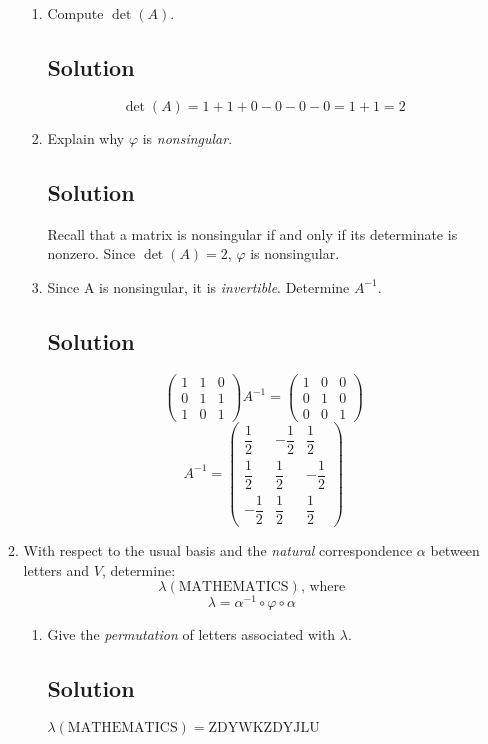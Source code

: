 \documentclass[12pt]{amsart}
\begin{document}
\begin{enumerate}
\begin{enumerate}
\begin{enumerate}
\item Compute $\det (A)$.
\subsection*{Solution}
\[ \det(A) = 1 + 1 + 0 - 0 - 0 - 0 = 1+1 = 2 \]

\item Explain why $\varphi$ is {\it nonsingular}.
\subsection*{Solution}
Recall that a matrix is nonsingular if and only if its determinate is nonzero. Since $\det (A) = 2$, $\varphi$ is nonsingular.

\item Since A is nonsingular, it is {\it invertible}. Determine $A^{-1}$.
\subsection*{Solution}
\[ \begin{pmatrix} 1&1&0 \\ 0&1&1 \\ 1&0&1 \end{pmatrix} A^{-1}
= \begin{pmatrix} 1&0&0 \\ 0&1&0 \\ 0&0&1 \end{pmatrix} \]
\[  A^{-1} = \begin{pmatrix}
\dfrac 1 2 & -\dfrac 1 2 & \dfrac 1 2 \\
\dfrac 1 2 & \dfrac 1 2 & -\dfrac 1 2 \\
-\dfrac 1 2 & \dfrac 1 2 & \dfrac 1 2
 \end{pmatrix} \]
 
\end{enumerate}

\item With respect to the usual basis and the {\it natural} correspondence $\alpha$ between letters and $V$, determine:
\[ \lambda(\textrm{MATHEMATICS}) \textrm{, where} \]
\[ \lambda = \alpha^{-1} \circ \varphi \circ \alpha \]
\begin{enumerate}\setlength{\itemsep}{6pt}

\item Give the {\it permutation} of letters associated with $\lambda$.
\subsection*{Solution}
$\lambda(\textrm{MATHEMATICS}) = \textrm{ZDYWKZDYJLU}$


\end{enumerate}
\end{enumerate}
\end{enumerate}
\end{document}
